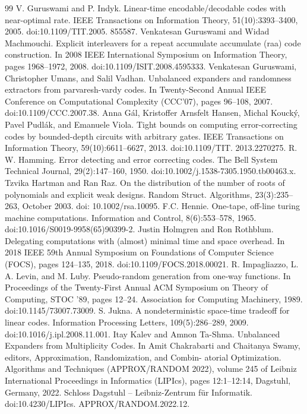 \documentclass[10pt,a4paper]{article}
\begin{document}
\begin{thebibliography}{99}
 V. Guruswami and P. Indyk. Linear-time encodable/decodable codes with near-optimal rate. IEEE Transactions on Information Theory, 51(10):3393–3400, 2005. doi:10.1109/TIT.2005. 855587.
 Venkatesan Guruswami and Widad Machmouchi. Explicit interleavers for a repeat accumulate accumulate (raa) code construction. In 2008 IEEE International Symposium on Information Theory, pages 1968–1972, 2008. doi:10.1109/ISIT.2008.4595333.
 Venkatesan Guruswami, Christopher Umans, and Salil Vadhan. Unbalanced expanders and randomness extractors from parvaresh-vardy codes. In Twenty-Second Annual IEEE Conference on Computational Complexity (CCC’07), pages 96–108, 2007. doi:10.1109/CCC.2007.38.
 Anna Gál, Kristoffer Arnsfelt Hansen, Michal Koucký, Pavel Pudlák, and Emanuele Viola. Tight bounds on computing error-correcting codes by bounded-depth circuits with arbitrary gates. IEEE Transactions on Information Theory, 59(10):6611–6627, 2013. doi:10.1109/TIT. 2013.2270275.
 R. W. Hamming. Error detecting and error correcting codes. The Bell System Technical Journal, 29(2):147–160, 1950. doi:10.1002/j.1538-7305.1950.tb00463.x.
 Tzvika Hartman and Ran Raz. On the distribution of the number of roots of polynomials and explicit weak designs. Random Struct. Algorithms, 23(3):235–263, October 2003. doi: 10.1002/rsa.10095.
 F.C. Hennie. One-tape, off-line turing machine computations. Information and Control, 8(6):553–578, 1965. doi:10.1016/S0019-9958(65)90399-2.
 Justin Holmgren and Ron Rothblum. Delegating computations with (almost) minimal time and space overhead. In 2018 IEEE 59th Annual Symposium on Foundations of Computer Science (FOCS), pages 124–135, 2018. doi:10.1109/FOCS.2018.00021.
 R. Impagliazzo, L. A. Levin, and M. Luby. Pseudo-random generation from one-way functions. In Proceedings of the Twenty-First Annual ACM Symposium on Theory of Computing, STOC ’89, pages 12–24. Association for Computing Machinery, 1989. doi:10.1145/73007.73009.
 S. Jukna. A nondeterministic space-time tradeoff for linear codes. Information Processing Letters, 109(5):286–289, 2009. doi:10.1016/j.ipl.2008.11.001.
 Itay Kalev and Amnon Ta-Shma. Unbalanced Expanders from Multiplicity Codes. In Amit Chakrabarti and Chaitanya Swamy, editors, Approximation, Randomization, and Combin- atorial Optimization. Algorithms and Techniques (APPROX/RANDOM 2022), volume 245 of Leibniz International Proceedings in Informatics (LIPIcs), pages 12:1–12:14, Dagstuhl, Germany, 2022. Schloss Dagstuhl – Leibniz-Zentrum für Informatik. doi:10.4230/LIPIcs. APPROX/RANDOM.2022.12.

\end{thebibliography}
\end{document}
